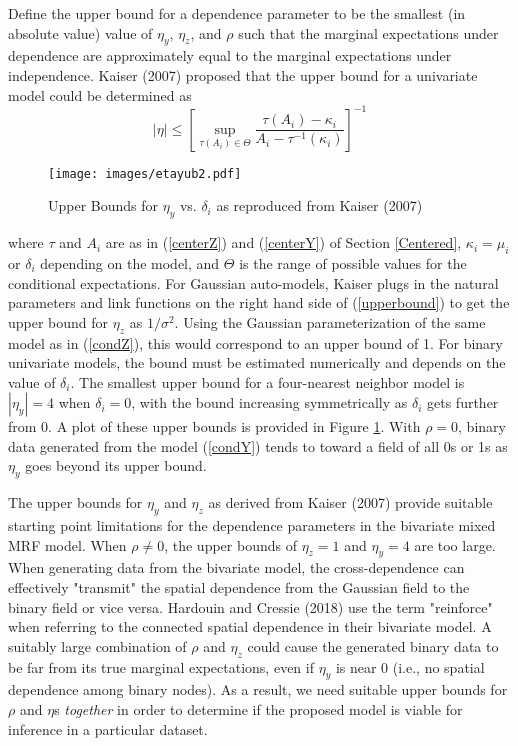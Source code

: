 \documentclass[12pt, a4paper, twoside]{article}
\begin{document}
Define the upper bound for a dependence parameter to be the smallest (in absolute value) value of $\eta_y$, $\eta_z$, and $\rho$ such that the marginal expectations under dependence are approximately equal to the marginal expectations under independence. Kaiser (2007) proposed that the upper bound for a univariate model could be determined as
\begin{equation} \label{upperbound}
|\eta| \leq \left\lbrack \sup_{\tau(A_i)\in\Theta}\frac{\tau(A_i) - \kappa_i}{A_i - \tau^{-1}(\kappa_i)} \right\rbrack^{-1}
\end{equation}
\begin{figure}[t]
	\centering
	\texttt{[image: images/etayub2.pdf]}
	\caption[Standard Upper Bounds for Autologistic Dependence Parameter]{Upper Bounds for $\eta_y$ vs. $\delta_i$ as reproduced from Kaiser (2007)}
	\label{etaUB}
\end{figure}
where $\tau$ and $A_i$ are as in (\ref{centerZ}) and (\ref{centerY}) of Section \ref{Centered},  $\kappa_i = \mu_i$ or $\delta_i$ depending on the model, and $\Theta$ is the range of possible values for the conditional expectations. For Gaussian auto-models, Kaiser plugs in the natural parameters and link functions on the right hand side of (\ref{upperbound}) to get the upper bound for $\eta_z$ as $1/\sigma^2$. Using the Gaussian parameterization of the same model as in (\ref{condZ}), this would correspond to an upper bound of 1. For binary univariate models, the bound must be estimated numerically and depends on the value of $\delta_i$. The smallest upper bound for a four-nearest neighbor model is $|\eta_y| = 4$ when $\delta_i = 0$, with the bound increasing symmetrically as $\delta_i$ gets further from 0. A plot of these upper bounds is provided in Figure \ref{etaUB}. With $\rho=0$, binary data generated from the model (\ref{condY}) tends to toward a field of all 0s or 1s as $\eta_y$ goes beyond its upper bound.

The upper bounds for $\eta_y$ and $\eta_z$ as derived from Kaiser (2007) provide suitable starting point limitations for the dependence parameters in the bivariate mixed MRF model. When $\rho \neq 0$, the upper bounds of $\eta_z = 1$ and $\eta_y = 4$ are too large. When generating data from the bivariate model, the cross-dependence can effectively "transmit" the spatial dependence from the Gaussian field to the binary field or vice versa. Hardouin and Cressie (2018) use the term "reinforce" when referring to the connected spatial dependence in their bivariate model.  A suitably large combination of $\rho$ and $\eta_{z}$ could cause the generated binary data to be far from its true marginal expectations, even if $\eta_y$ is near 0 (i.e., no spatial dependence among binary nodes). As a result, we need suitable upper bounds for $\rho$ and $\eta$s \textit{together} in order to determine if the proposed model is viable for inference in a particular dataset.
\end{document}
